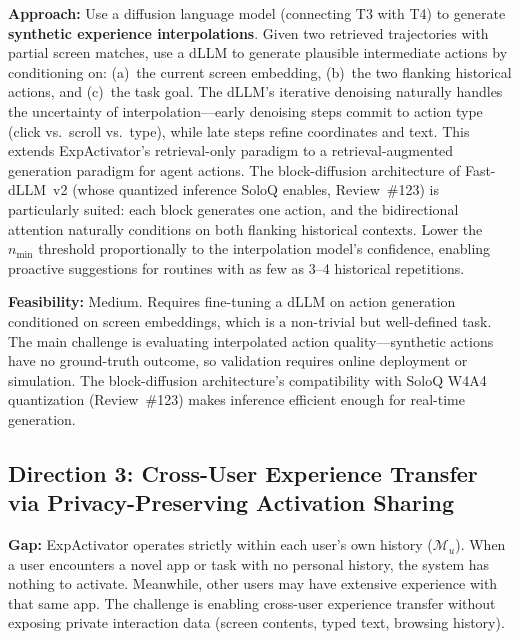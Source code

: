 \documentclass[11pt,a4paper]{article}
\begin{document}
\textbf{Approach:} Use a diffusion language model (connecting T3 with T4) to generate \textbf{synthetic experience interpolations}. Given two retrieved trajectories with partial screen matches, use a dLLM to generate plausible intermediate actions by conditioning on: (a)~the current screen embedding, (b)~the two flanking historical actions, and (c)~the task goal. The dLLM's iterative denoising naturally handles the uncertainty of interpolation---early denoising steps commit to action type (click vs.\ scroll vs.\ type), while late steps refine coordinates and text. This extends ExpActivator's retrieval-only paradigm to a retrieval-augmented generation paradigm for agent actions. The block-diffusion architecture of Fast-dLLM~v2 (whose quantized inference SoloQ enables, Review~\#123) is particularly suited: each block generates one action, and the bidirectional attention naturally conditions on both flanking historical contexts. Lower the $n_{\min}$ threshold proportionally to the interpolation model's confidence, enabling proactive suggestions for routines with as few as 3--4 historical repetitions.

\textbf{Feasibility:} Medium. Requires fine-tuning a dLLM on action generation conditioned on screen embeddings, which is a non-trivial but well-defined task. The main challenge is evaluating interpolated action quality---synthetic actions have no ground-truth outcome, so validation requires online deployment or simulation. The block-diffusion architecture's compatibility with SoloQ W4A4 quantization (Review~\#123) makes inference efficient enough for real-time generation.

\subsection{Direction 3: Cross-User Experience Transfer via Privacy-Preserving Activation Sharing}
\textbf{Gap:} ExpActivator operates strictly within each user's own history ($\mathcal{M}_u$). When a user encounters a novel app or task with no personal history, the system has nothing to activate. Meanwhile, other users may have extensive experience with that same app. The challenge is enabling cross-user experience transfer without exposing private interaction data (screen contents, typed text, browsing history).
\end{document}

